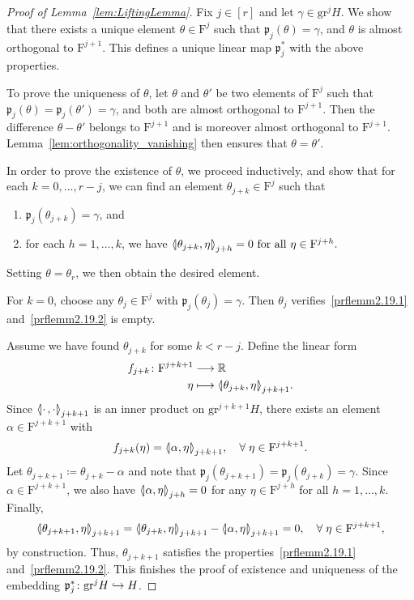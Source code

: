 \documentclass[10pt,a4paper]{amsart}
\newcommand{\llangle}{\mathopen{\langle\mkern -3.1mu\lvert}}
\newcommand{\rrangle}{\mathclose{\rvert\mkern -3.1mu\rangle}}
\newcommand{\highinn}[2]{{\llangle#2\rrangle_{#1}}}
\newcommand{\filter}{\mathrm{F}}
\newcommand{\R}{\mathbb{R}}
\newcommand{\grm}[2]{\mathrm{gr}_{#1}^{#2}}
\newcommand{\proj}{\mathfrak{p}}
\renewcommand*{\to}{\mathchoice{\longrightarrow}{\rightarrow}{\rightarrow}{\rightarrow}}
\newcommand{\longhookrightarrow}{\lhook\joinrel\longrightarrow}
\newcommand*{\hookto}{\mathchoice{\longhookrightarrow}{\hookrightarrow}{\hookrightarrow}{\hookrightarrow}}
\newcommand*{\relabel}{\renewcommand{\labelenumi}{(\theenumi)}}
\newcommand*{\romanenumi}{\renewcommand*{\theenumi}{\roman{enumi}}\relabel}
\let\oldforall\forall
\renewcommand*{\forall}{\mathrel{\oldforall}}
\theoremstyle{definition}\newtheorem{defi}[cdrthm]{Definition}
\begin{document}
\begin{proof}[Proof of Lemma~\ref{lem:LiftingLemma}]
Fix $j \in [r]$ and let $\gamma\in \grm{}{j}H$. We show that there exists a unique element $\theta \in \filter^j$ such that $\proj_j(\theta) =\gamma$, and $\theta$ is almost orthogonal to $\filter^{j+1}$. This defines a unique linear map $\proj_j^*$ with the above properties.

To prove the uniqueness of $\theta$, let $\theta$ and $\theta'$ be two elements of $\filter^j$ such that $\proj_j(\theta) =\proj_j(\theta') = \gamma$, and both are almost orthogonal to $\filter^{j+1}$. Then the difference $\theta-\theta'$ belongs to $\filter^{j+1}$ and is moreover almost orthogonal to $\filter^{j+1}$. Lemma~\ref{lem:orthogonality_vanishing} then ensures that $\theta =\theta'$.


In order to prove the existence of $\theta$, we proceed inductively, and show that for each $k=0, \dots, r-j$, we can find an element $\theta_{j+k}\in \filter^j$ such that
\begin{enumerate}\romanenumi
\item\label{prflemm2.19.1} $\proj_j(\theta_{j+k}) = \gamma$, and

\item\label{prflemm2.19.2} for each $h=1, \dots, k$, we have $\highinn{j+h}{\theta_{j+k}, \eta} = 0 \text{ for all }\eta\in \filter^{j+h}.$
\end{enumerate}
Setting $\theta = \theta_{r}$, we then obtain the desired element.

For $k=0$, choose any $\theta_j \in \filter^j$ with $\proj_j(\theta_j) =\gamma$. Then $\theta_j$ verifies~\eqref{prflemm2.19.1} and~\eqref{prflemm2.19.2} is empty.

Assume we have found $\theta_{j+k}$ for some $k< r-j$. Define the linear form
\begin{align*}
f_{j+k}\colon \filter^{j+k+1} &\to \R\\
\eta &\longmapsto \highinn{j+k+1}{\theta_{j+k}, \eta}.
\end{align*}
Since $\highinn{j+k+1}{\cdot \,, \cdot}$ is an inner product on $\grm{}{j+k+1}H$, there exists an element $\alpha \in \filter^{j+k+1}$ with
\[
f_{j+k}(\eta) = \highinn{j+k+1}{\alpha, \eta}, \quad \forall \eta\in \filter^{j+k+1}.
\]
Let $\theta_{j+k+1} \coloneqq \theta_{j+k} - \alpha$ and note that $\proj_j(\theta_{j+k+1}) = \proj_j(\theta_{j+k}) =\gamma$. Since $\alpha \in \filter^{j+k+1}$, we also have $\highinn{j+h}{\alpha, \eta}=0$ for any $\eta \in \filter^{j+h}$ for all $h=1, \dots, k$. Finally,
\[
\highinn{j+k+1}{\theta_{j+k+1}, \eta} = \highinn{j+k+1}{\theta_{j+k}, \eta} - \highinn{j+k+1}{\alpha, \eta}= 0, \quad \forall \eta\in \filter^{j+k+1},
\]
by construction. Thus, $\theta_{j+k+1}$ satisfies the properties~\eqref{prflemm2.19.1} and~\eqref{prflemm2.19.2}. This finishes the proof of existence and uniqueness of the embedding $\proj_j^* \colon \grm{}{j}H \hookto H$.


\end{proof}
\end{document}
